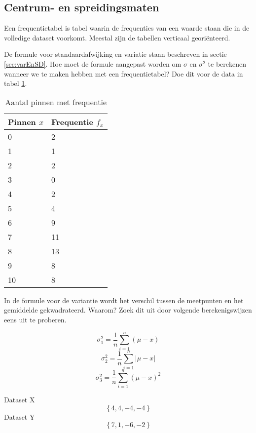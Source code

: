 \subsection{Centrum- en spreidingsmaten}

\begin{definition}
	Een frequentietabel is tabel waarin de frequenties van een waarde staan die in de volledige dataset voorkomt. Meestal zijn de tabellen verticaal georiënteerd.
\end{definition}

\begin{exercise}
  De formule voor standaardafwijking en variatie staan beschreven in sectie \ref{sec:varEnSD}. Hoe moet de formule aangepast worden om $\sigma$ en $\sigma^{2}$ te berekenen wanneer we te maken hebben met een frequentietabel? Doe dit voor de data in tabel \ref{tab:pinfreq}.
\end{exercise}

	\begin{table}
		\centering
		\caption{Aantal pinnen met frequentie}
		\label{tab:pinfreq}
		\begin{tabular}{@{}ll@{}}
			\toprule
			Pinnen $x$ & Frequentie $f_{x}$ \\ \midrule
			0          & 2                  \\
			1          & 1                  \\
			2          & 2                  \\
			3          & 0                  \\
			4          & 2                  \\
			5          & 4                  \\
			6          & 9                  \\
			7          & 11                 \\
			8          & 13                 \\
			9          & 8                  \\ \midrule
			10         & 8                  \\ \bottomrule
		\end{tabular}
	\end{table}
	
\begin{exercise}
In de formule voor de variantie  wordt het verschil tussen de meetpunten en het gemiddelde gekwadrateerd. Waarom? Zoek dit uit door volgende berekenigswijzen eens uit te proberen.

\[ \sigma^{2}_{1} = \frac{1}{n} \sum_{i=1}^{n} (\mu - x) \]
\[ \sigma^{2}_{2} = \frac{1}{n} \sum_{i=1}^{n} \left| \mu - x\right| \]
\[ \sigma^{2}_{3} = \frac{1}{n} \sum_{i=1}^{n} (\mu - x)^{2} \]

Dataset X \[ \left\{ 4,4,-4,-4 \right\} \]
Dataset Y \[ \left\{ 7,1,-6,-2 \right\} \]
\end{exercise}

